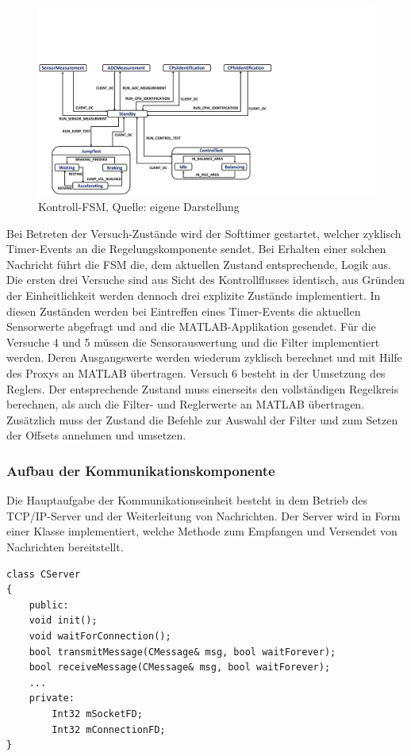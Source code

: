 \begin{figure}[!h]
\centering
\includegraphics[width=1\linewidth, trim={0cm 0cm 10cm 5.5cm}, clip]{img/SW_KontrollFSM}
\caption{Kontroll-FSM, Quelle: eigene Darstellung}
\end{figure}


Bei Betreten der Versuch-Zustände wird der Softtimer gestartet, welcher zyklisch Timer-Events an die Regelungskomponente sendet. Bei Erhalten einer solchen Nachricht führt die FSM die, dem aktuellen Zustand entsprechende, Logik aus. 
Die ersten drei Versuche sind aus Sicht des Kontrollflusses identisch, aus Gründen der Einheitlichkeit werden dennoch drei explizite Zustände implementiert. In diesen Zuständen werden bei Eintreffen eines Timer-Events die aktuellen Sensorwerte abgefragt und and die MATLAB-Applikation gesendet. Für die Versuche 4 und 5 müssen die Sensorauswertung und die Filter implementiert werden. Deren Ausgangswerte werden wiederum zyklisch berechnet und mit Hilfe des Proxys an MATLAB übertragen. Versuch 6 besteht in der Umsetzung des Reglers. Der entsprechende Zustand muss einerseits den vollständigen Regelkreis berechnen, als auch die Filter- und Reglerwerte an MATLAB übertragen. Zusätzlich muss der Zustand die Befehle zur Auswahl der Filter und zum Setzen der Offsets annehmen und umsetzen.

\subsubsection{Aufbau der Kommunikationskomponente}
Die Hauptaufgabe der Kommunikationseinheit besteht in dem Betrieb des TCP/IP-Server und der Weiterleitung von Nachrichten. Der Server wird in Form einer Klasse implementiert, welche Methode zum Empfangen und Versendet von Nachrichten bereitstellt. 

\begin{lstlisting}
class CServer
{
	public:
	void init();
	void waitForConnection();
	bool transmitMessage(CMessage& msg, bool waitForever);
	bool receiveMessage(CMessage& msg, bool waitForever);
	...
	private:
		Int32 mSocketFD;
		Int32 mConnectionFD;
}
\end{lstlisting}

